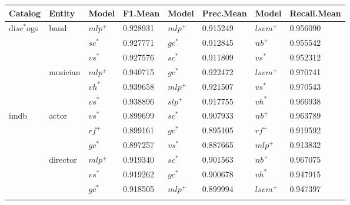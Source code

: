 \documentclass[epsfig,a4paper,11pt,titlepage,twoside,openany]{book}
\begin{document}
\begin{table}[H]
\centering
\begin{tabular}{|l|l|ll|ll|ll|}
\hline
Catalog                      & Entity                    & Model & F1.Mean  & Model & Prec.Mean & Model                & Recall.Mean \\ \hline
\multirow{6}{*}{di$sc^*$ogs}     & \multirow{3}{*}{band}     & $mlp^+$  & 0.928931 & $mlp^+$   & 0.915249  & $lsvm^+$                 & 0.956090    \\
                             &                           & $sc^*$    & 0.927771 & $gc^*$    & 0.912845  & $nb^+$                   & 0.955542    \\
                             &                           & $vs^*$    & 0.927576 & $sc^*$    & 0.911809  & $vs^*$                   & 0.952312    \\ \cline{2-8} 
                             & \multirow{3}{*}{musician} & $mlp^+$   & 0.940715 & $gc^*$    & 0.922472  & $lsvm^+$                 & 0.970741    \\
                             &                           & $vh^*$    & 0.939658 & $mlp^+$   & 0.921507  & $vs^*$                   & 0.970543    \\
                             &                           & $vs^*$    & 0.938896 & $slp^+$   & 0.917755  & $vh^*$                   & 0.966938    \\ \hline
\multirow{15}{*}{imdb}       & \multirow{3}{*}{actor}    & $vs^*$    & 0.899699 & $sc^*$    & 0.907933  & $nb^+$                   & 0.963789    \\
                             &                           & $rf^+$    & 0.899161 & $gc^*$    & 0.895105  & $rf^+$                   & 0.919592    \\
                             &                           & $gc^*$    & 0.897257 & $vs^*$    & 0.887665  & $mlp^+$                  & 0.913832    \\ \cline{2-8} 
                             & \multirow{3}{*}{director} & $mlp^+$   & 0.919340 & $sc^*$    & 0.901563  & $nb^+$                   & 0.967075    \\
                             &                           & $vs^*$    & 0.919262 & $gc^*$    & 0.900678  & $vh^*$                   & 0.947915    \\
                             &                           & $gc^*$    & 0.918505 & $mlp^+$   & 0.899994  & $lsvm^+$                 & 0.947397    \\ \cline{2-8} 

\end{tabular}
\end{table}
\end{document}
